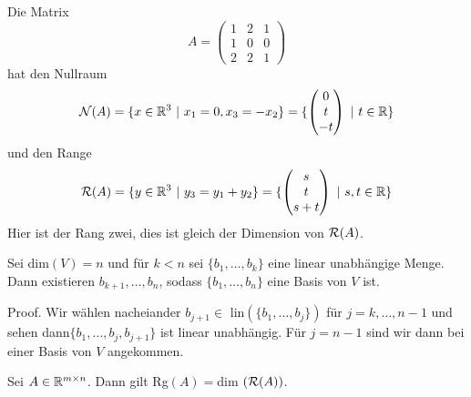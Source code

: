 \begin{example}{}{}



Die Matrix
\begin{equation*}
 A = \left(\begin{matrix} 1 & 2 & 1 \\ 1 & 0 & 0  \\ 2 & 2 & 1  \end{matrix} \right)
\end{equation*}
hat den Nullraum
\begin{equation*}
 {\cal N}(A) = \{ x \in \mathbb{R}^3 ~|~x_1=0, x_3= -x_2\} =\{ \left(\begin{matrix} 0 \\ t  \\ -t  \end{matrix} \right) ~|~ t \in \mathbb{R}\}
\end{equation*}
und den Range
\begin{equation*}
 {\cal R}(A) = \{ y \in \mathbb{R}^3~|~y_3 = y_1 + y_2\}=\{ \left(\begin{matrix} s \\ t  \\ s+t  \end{matrix} \right) ~|~ s,t \in \mathbb{R}\}
\end{equation*}
Hier ist der Rang zwei, dies ist gleich der Dimension von \({\cal R}(A)\).
\end{example}
\label{vektorraeume/LGS:lemma-1}
\begin{lemma}{}{}



Sei dim\((V)=n\) und für \(k < n\) sei \(\{b_1,\ldots,b_k\}\) eine linear unabhängige Menge. Dann existieren \(b_{k+1}, \ldots, b_n\), sodass \(\{b_1,\ldots,b_n\}\) eine Basis von \(V\) ist.
\end{lemma}

\begin{emphBox}{}{}
Proof.  Wir wählen nacheiander \(b_{j+1} \in \) lin\((\{b_1,\ldots,b_j\})\) für \(j=k,\ldots,n-1\) und sehen dann\( \{b_1,\ldots,b_j,b_{j+1} \}\) ist linear unabhängig. Für \(j=n-1\) sind wir dann bei einer Basis von \(V\) angekommen.
\end{emphBox}
\label{vektorraeume/LGS:lemma-2}
\begin{lemma}{}{}



Sei \(A \in \mathbb{R}^{m \times n}\). Dann gilt Rg\((A)=\)dim \(({\cal R}(A))\).
\end{lemma}

